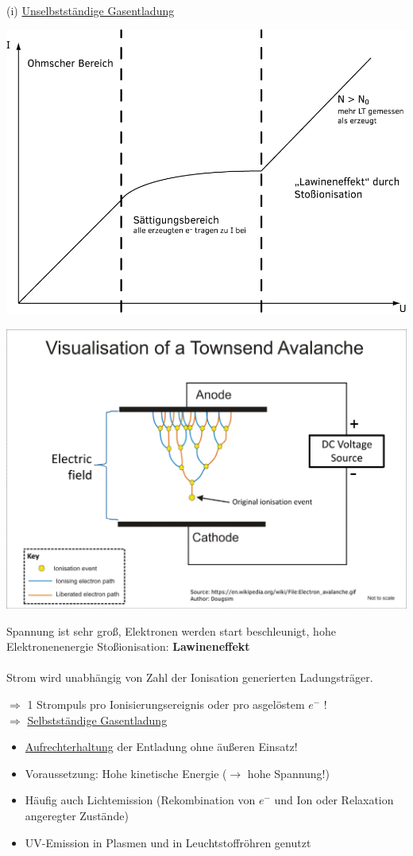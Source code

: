 \documentclass[11pt]{article}
\begin{document}
	\\
	(i) \underline{Unselbstständige Gasentladung} \\
	\begin{center}
		\includegraphics[width=0.8\linewidth]{skizzen/15/VL07/VL7_2}
	\end{center}
	\begin{center}
		\includegraphics[width=0.7\linewidth]{skizzen/15/VL07/7}\\
		\begin{flushleft}
			Spannung ist sehr groß, Elektronen werden start beschleunigt, hohe Elektronenenergie Stoßionisation: \textbf{Lawineneffekt}\\
			\hfill \\
			Strom wird unabhängig von Zahl der Ionisation generierten Ladungsträger. 
		\end{flushleft}
	\end{center}
	$ \Rightarrow $ 1 Strompuls pro Ionisierungsereignis oder pro asgelöstem $ e^- $ ! \\
	$ \Rightarrow $ \underline{Selbstständige Gasentladung}
	\begin{itemize}
		\item \underline{Aufrechterhaltung} der Entladung ohne äußeren Einsatz!
		\item Voraussetzung: Hohe kinetische Energie ($ \longrightarrow $ hohe Spannung!)
		\item Häufig auch Lichtemission (Rekombination von $ e^- $ und Ion oder Relaxation angeregter Zustände)
		\item UV-Emission in Plasmen und in Leuchtstoffröhren genutzt
	\end{itemize}
\end{document}
